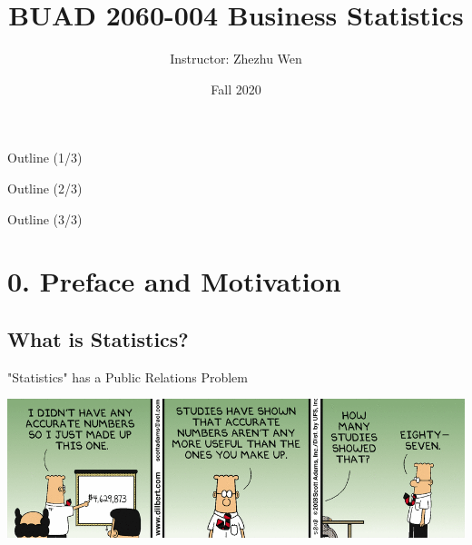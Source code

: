 \documentclass{beamer}
\title[LaTeX Workshop]{BUAD 2060-004 Business Statistics}
\author{Instructor: \linebreak Zhezhu Wen}
\institute{The University of Toledo}
\date{Fall 2020}
\begin{document}
\begin{frame}
  \titlepage
\end{frame}




\begin{frame}{Outline (1/3)}

\begin{small}
\begin{multicols}{2}
  \tableofcontents[sections={1-3}]

\end{multicols}
\end{small}

\end{frame}


\begin{frame}{Outline (2/3)}

\begin{small}
\begin{multicols}{2}
  \tableofcontents[sections={4-5}]

\end{multicols}
\end{small}


\end{frame}


\begin{frame}{Outline (3/3)}

\begin{small}
\begin{multicols}{2}
  \tableofcontents[sections={6}]

\end{multicols}
\end{small}


\end{frame}



\section{0. Preface and Motivation}
\subsection{What is Statistics?} 


\begin{frame}{"Statistics" has a Public Relations Problem}

\begin{center}
\includegraphics[scale=0.48]{dilbertStatistics.png}
\end{center}


\end{frame}
\end{document}
